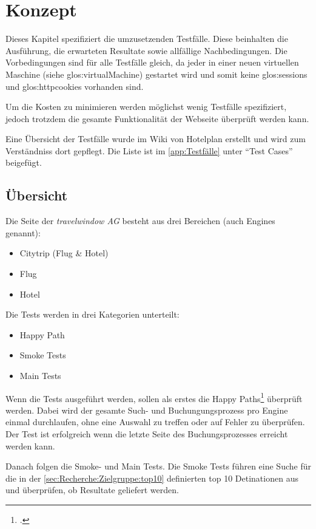 
\chapter{Konzept}
Dieses Kapitel spezifiziert die umzusetzenden Testfälle. Diese beinhalten die Ausführung, die erwarteten Resultate sowie allfällige Nachbedingungen. Die Vorbedingungen sind für alle Testfälle gleich, da jeder in einer neuen virtuellen Maschine (siehe \Gls{glos:virtualMachine}) gestartet wird und somit keine \Glspl{glos:session} und \Glspl{glos:httpcookie} vorhanden sind.

Um die Kosten zu minimieren werden möglichst wenig Testfälle spezifiziert, jedoch trotzdem die gesamte Funktionalität der Webseite überprüft werden kann.

Eine Übersicht der Testfälle wurde im Wiki von Hotelplan erstellt und wird zum Verständniss dort gepflegt. Die Liste ist im \cref{app:Testfälle}  unter "`Test Cases"' beigefügt.

\section{Übersicht}
Die Seite der \textit{travelwindow AG} besteht aus drei Bereichen (auch Engines genannt):
\begin{itemize}
\item Citytrip (Flug \& Hotel)
\item Flug
\item Hotel
\end{itemize}

Die Tests werden in drei Kategorien unterteilt:
\begin{itemize}
\item Happy Path
\item Smoke Tests
\item Main Tests
\end{itemize}

Wenn die Tests ausgeführt werden, sollen als erstes die Happy Paths\footcite{Happy_path_-_Wikipedia_the_free_encyclopedia_2015-07-30} überprüft werden. Dabei wird der gesamte Such- und Buchungungsprozess pro Engine einmal durchlaufen, ohne eine Auswahl zu treffen oder auf Fehler zu überprüfen. Der Test ist erfolgreich wenn die letzte Seite des Buchungsprozesses erreicht werden kann.

Danach folgen die Smoke- und Main Tests. Die Smoke Tests führen eine Suche für die in der \cref{sec:Recherche:Zielgruppe:top10}  definierten top 10 Detinationen aus und überprüfen, ob Resultate geliefert werden.

